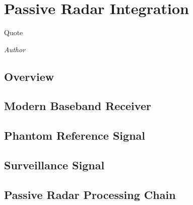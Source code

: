 \documentclass[class=report,11pt,crop=false]{standalone}
\begin{document}
\chapter{Passive Radar Integration}
\epigraph{Quote}%
    {\emph{Author}}

\section{Overview}

\blindmathpaper

\section{Modern Baseband Receiver}
\blindmathpaper

\section{Phantom Reference Signal}
\blindmathpaper

\section{Surveillance Signal}
\blindmathpaper

\section{Passive Radar Processing Chain}
\blindmathpaper











\ifstandalone

\printnoidxglossary[type=\acronymtype]
\fi
\end{document}

